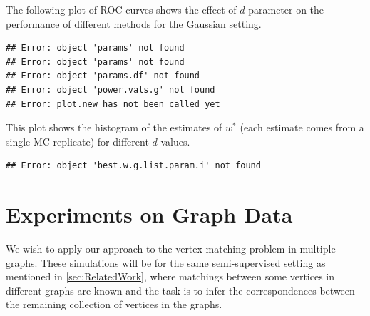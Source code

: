 \documentclass[11pt]{article} %
\begin{document}
The following plot of ROC curves\cite{d-ROC} shows the effect of $d$ parameter on the performance of different methods for the Gaussian setting. 

\begin{knitrout}
\color{fgcolor}\begin{kframe}
\begin{verbatim}
## Error: object 'params' not found
## Error: object 'params' not found
## Error: object 'params.df' not found
## Error: object 'power.vals.g' not found
## Error: plot.new has not been called yet
\end{verbatim}
\end{kframe}
\end{knitrout}


This plot shows the histogram of the estimates of $ w^{*} $ (each estimate comes from a single MC replicate)  
for different $ d $ values.

\begin{knitrout}
\color{fgcolor}\begin{kframe}
\begin{verbatim}
## Error: object 'best.w.g.list.param.i' not found
\end{verbatim}
\end{kframe}
\end{knitrout}




\section{Experiments on Graph Data}

We wish to apply our approach to  the vertex matching problem in multiple graphs. These simulations will be for the same semi-supervised setting as mentioned in \ref{sec:RelatedWork}, where matchings between some vertices in different graphs are known 
  and the task is to infer the correspondences between the remaining collection of vertices in the graphs.
\end{document}
